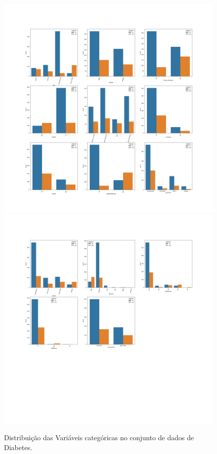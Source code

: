 \begin{figure}[H]
 \caption{Distribuição das Variáveis categóricas no conjunto de dados de Diabetes.}
 \label{fig:var:cat:1:diab}
 \centering
\includegraphics[scale=0.2]{images/diabete_desc.png}
\includegraphics[scale=0.2]{images/diabete_desc_2.png}
\end{figure}


